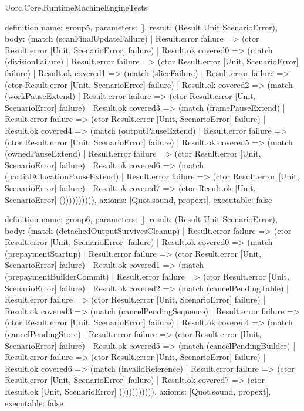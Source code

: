 \begin{lexlean}{Uorc.Core.RuntimeMachineEngineTests}
\begin{semanticmodule}
definition{
  name: group5,
  parameters: [],
  result: (Result Unit ScenarioError),
  body: (match (scanFinalUpdateFailure)
    | Result.error failure => (ctor Result.error [Unit, ScenarioError] failure)
    | Result.ok covered0 => (match (divisionFailure)
      | Result.error failure => (ctor Result.error [Unit, ScenarioError] failure)
      | Result.ok covered1 => (match (sliceFailure)
        | Result.error failure => (ctor Result.error [Unit, ScenarioError] failure)
        | Result.ok covered2 => (match (workPauseExtend)
          | Result.error failure => (ctor Result.error [Unit, ScenarioError] failure)
          | Result.ok covered3 => (match (framePauseExtend)
            | Result.error failure => (ctor Result.error [Unit, ScenarioError] failure)
            | Result.ok covered4 => (match (outputPauseExtend)
              | Result.error failure => (ctor Result.error [Unit, ScenarioError] failure)
              | Result.ok covered5 => (match (ownedPauseExtend)
                | Result.error failure => (ctor Result.error [Unit, ScenarioError] failure)
                | Result.ok covered6 => (match (partialAllocationPauseExtend)
                  | Result.error failure => (ctor Result.error [Unit, ScenarioError] failure)
                  | Result.ok covered7 => (ctor Result.ok [Unit, ScenarioError] ()))))))))),
  axioms: [Quot.sound, propext],
  executable: false
}

definition{
  name: group6,
  parameters: [],
  result: (Result Unit ScenarioError),
  body: (match (detachedOutputSurvivesCleanup)
    | Result.error failure => (ctor Result.error [Unit, ScenarioError] failure)
    | Result.ok covered0 => (match (prepaymentStartup)
      | Result.error failure => (ctor Result.error [Unit, ScenarioError] failure)
      | Result.ok covered1 => (match (prepaymentBuilderCommit)
        | Result.error failure => (ctor Result.error [Unit, ScenarioError] failure)
        | Result.ok covered2 => (match (cancelPendingTable)
          | Result.error failure => (ctor Result.error [Unit, ScenarioError] failure)
          | Result.ok covered3 => (match (cancelPendingSequence)
            | Result.error failure => (ctor Result.error [Unit, ScenarioError] failure)
            | Result.ok covered4 => (match (cancelPendingStore)
              | Result.error failure => (ctor Result.error [Unit, ScenarioError] failure)
              | Result.ok covered5 => (match (cancelPendingBuilder)
                | Result.error failure => (ctor Result.error [Unit, ScenarioError] failure)
                | Result.ok covered6 => (match (invalidReference)
                  | Result.error failure => (ctor Result.error [Unit, ScenarioError] failure)
                  | Result.ok covered7 => (ctor Result.ok [Unit, ScenarioError] ()))))))))),
  axioms: [Quot.sound, propext],
  executable: false
}


\end{semanticmodule}
\end{lexlean}
